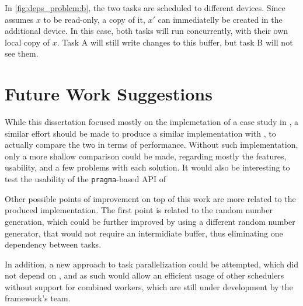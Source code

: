 \documentclass[main.tex]{subfiles}
\begin{document}

In \cref{fig:deps_problem:b}, the two tasks are scheduled to different devices. Since \starpu assumes $x$ to be read-only, a copy of it, $x'$ can immediatelly be created in the additional device. In this case, both tasks will run concurrently, with their own local copy of $x$. Task A will still write changes to this buffer, but task B will not see them.




\section{Future Work Suggestions}

While this dissertation focused mostly on the implemetation of a case study in \starpu, a similar effort should be made to produce a similar implementation with \gama, to actually compare the two in terms of performance. Without such implementation, only a more shallow comparison could be made, regarding mostly the features, usability, and a few problems with each solution.
It would also be interesting to test the usability of the \texttt{pragma}-based API of \starpu

Other possible points of improvement on top of this work are more related to the produced implementation. The first point is related to the random number generation, which could be further improved by using a different random number generator, that would not require an intermidiate buffer, thus eliminating one dependency between tasks.

In addition, a new approach to task parallelization could be attempted, which did not depend on \openmp, and as such would allow an efficient usage of other \starpu schedulers without support for combined workers, which are still under development by the framework's team.
\end{document}
